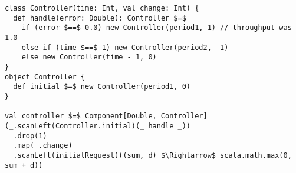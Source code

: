 \hspace*{-\parindent}
\begin{minipage}{\linewidth}
\begin{lstlisting}[style=ScalaStyle, caption={Controller implementation for controlling the buffer}, label={lst:buffer-controller}]
class Controller(time: Int, val change: Int) {
  def handle(error: Double): Controller $=$
    if (error $==$ 0.0) new Controller(period1, 1) // throughput was 1.0
    else if (time $==$ 1) new Controller(period2, -1)
    else new Controller(time - 1, 0)
}
object Controller {
  def initial $=$ new Controller(period1, 0)
}

val controller $=$ Component[Double, Controller](_.scanLeft(Controller.initial)(_ handle _))
  .drop(1)
  .map(_.change)
  .scanLeft(initialRequest)((sum, d) $\Rightarrow$ scala.math.max(0, sum + d))
\end{lstlisting}
\end{minipage}

